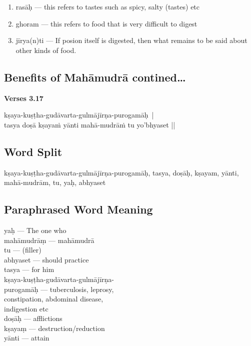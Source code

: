 \begin{enumerate}
\item rasāḥ --- this refers to tastes such as spicy, salty (tastes) etc 
\item ghoram --- this refers to food that is very difficult to digest 
\item jīrya(n)ti --- If posion itself is digested, then what remains to be said about other kinds of food. 
\end{enumerate}

\subsection*{Benefits of Mahāmudrā contined…}

\noindent \textbf{Verses 3.17}

\begin{shloka}
kṣaya-kuṣṭha-gudāvarta-gulmājīrṇa-purogamāḥ |\\ 
tasya doṣā kṣayaṁ yānti mahā-mudrāṁ tu yo'bhyaset ||
\end{shloka}

\subsection*{Word Split}

kṣaya-kuṣṭha-gudāvarta-gulmājīrṇa-purogamāḥ, tasya, doṣāḥ, kṣayam, yānti, mahā-mudrām, tu, yaḥ, abhyaset

\subsection*{Paraphrased Word Meaning}

\begin{multicols}{2}
yaḥ --- The one who \\
mahāmudrāṃ ---  mahāmudrā\\
tu --- (filler)\\
abhyaset --- should practice \\
tasya --- for him \\
kṣaya-kuṣṭha-gudāvarta-gulmājīrṇa-\\
purogamāḥ --- tuberculosis, leprosy, \\
constipation, abdominal disease, \\
indigestion etc \\
doṣāḥ --- afflictions \\
kṣayaṃ --- destruction/reduction \\
yānti --- attain 
\end{multicols}

